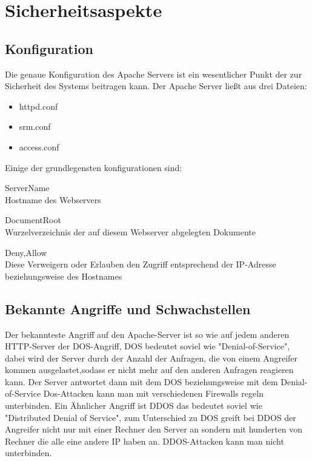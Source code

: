 \documentclass[a4paper, 11pt]{article}
\begin{document}
\newpage


\section{Sicherheitsaspekte}

\subsection{Konfiguration}
Die genaue Konfiguration des Apache Servers ist ein wesentlicher Punkt der zur Sicherheit des Systems beitragen kann. Der Apache Server ließt aus drei Dateien:
\begin{itemize}
\item{httpd.conf}
\item{srm.conf}
\item{access.conf}
\end{itemize}
Einige der grundlegensten konfigurationen sind:
\begin{description}
\item{ServerName \\ Hostname des Webservers}
\item{DocumentRoot \\ Wurzelverzeichnis der auf diesem Webserver abgelegten 
Dokumente }
\item{Deny,Allow \\ Diese Verweigern oder Erlauben den Zugriff entsprechend der IP-Adresse beziehungsweise des Hostnames }
\end{description} 

\subsection{Bekannte Angriffe und Schwachstellen}
Der bekannteste Angriff auf den Apache-Server ist so wie auf jedem anderen HTTP-Server der DOS-Angriff, DOS bedeutet soviel wie "Denial-of-Service", dabei wird der Server durch der Anzahl der Anfragen, die von einem Angreifer kommen ausgelastet,sodass er nicht mehr auf den anderen Anfragen reagieren kann. Der Server antwortet dann mit dem DOS beziehungsweise mit dem Denial-of-Service Dos-Attacken kann man mit verschiedenen Firewalls regeln unterbinden. Ein Ähnlicher Angriff ist DDOS das bedeutet soviel wie "Distributed Denial of Service", zum Unterschied zu DOS greift bei DDOS der Angreifer nicht nur mit einer Rechner den Server an sondern mit hunderten von Rechner die alle eine andere IP haben an. DDOS-Attacken kann man nicht unterbinden.
\end{document}
